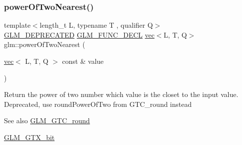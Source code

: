 \subsubsection{\texorpdfstring{power\+Of\+Two\+Nearest()}{powerOfTwoNearest()}\hspace{0.1cm}{\footnotesize\ttfamily [2/2]}}
{\footnotesize\ttfamily template$<$length\+\_\+t L, typename T , qualifier Q$>$ \\
\hyperlink{setup_8hpp_a8edfb48cdc249a3ee48406bf179023dc}{G\+L\+M\+\_\+\+D\+E\+P\+R\+E\+C\+A\+T\+ED} \hyperlink{setup_8hpp_ab2d052de21a70539923e9bcbf6e83a51}{G\+L\+M\+\_\+\+F\+U\+N\+C\+\_\+\+D\+E\+CL} \hyperlink{structglm_1_1vec}{vec}$<$L, T, Q$>$ glm\+::power\+Of\+Two\+Nearest (\begin{DoxyParamCaption}\item[{\hyperlink{structglm_1_1vec}{vec}$<$ L, T, Q $>$ const \&}]{value }\end{DoxyParamCaption})}

Return the power of two number which value is the closet to the input value. Deprecated, use round\+Power\+Of\+Two from G\+T\+C\+\_\+round instead

\begin{DoxySeeAlso}{See also}
\hyperlink{group__gtc__round}{G\+L\+M\+\_\+\+G\+T\+C\+\_\+round} 

\hyperlink{group__gtx__bit}{G\+L\+M\+\_\+\+G\+T\+X\+\_\+bit} 
\end{DoxySeeAlso}
